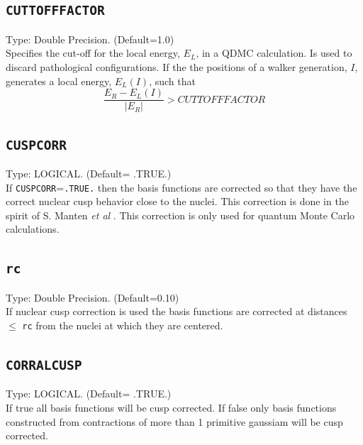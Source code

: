 \documentclass[a4paper,twoside,openany]{book}
\begin{document}
{{\subsection{\texttt{CUTTOFFFACTOR}}
Type: Double Precision. (Default=1.0)\\
Specifies the cut-off for the local energy, $E_{L}$,  in a QDMC calculation. Is used to discard pathological configurations. If the the positions of 
a walker generation, $I$, generates a local energy, $E_{L}(I)$, such that 
\begin{equation}
\frac{E_{R}-E_{L}(I)}{|E_{R}|} > CUTTOFFFACTOR
\end{equation}

\subsection{\texttt{CUSPCORR}}
Type:  LOGICAL. (Default= .TRUE.)\\
If  \texttt{CUSPCORR}=\texttt{.TRUE.} then the basis functions are corrected so that they have the correct nuclear cusp behavior close to the nuclei. 
This correction is done in the spirit of S. Manten {\it et al} \cite{CUSP}. This correction is only used for quantum Monte Carlo calculations.

\subsection{\texttt{rc}}
Type: Double Precision. (Default=0.10)\\
If nuclear cusp correction is used the basis functions are corrected  at distances $\leq$ \texttt{rc} from the nuclei at which they are centered.

\subsection{\texttt{CORRALCUSP}}
Type:  LOGICAL. (Default= .TRUE.)\\
If true all basis functions will be cusp corrected. If false only basis functions constructed from contractions of more than 1 primitive gaussiam will be cusp corrected.

}}
\end{document}
